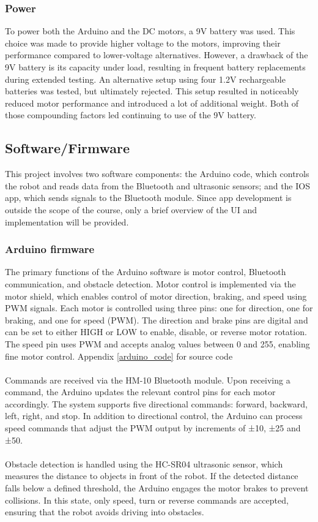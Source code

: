 \subsubsection{Power}
To power both the Arduino and the DC motors, a 9V battery was used. This choice was made to provide higher voltage to the motors, improving their performance compared to lower-voltage alternatives. However, a drawback of the 9V battery is its capacity under load, resulting in frequent battery replacements during extended testing. An alternative setup using four 1.2V rechargeable batteries was tested, but ultimately rejected. This setup resulted in noticeably reduced motor performance and introduced a lot of additional weight. Both of those compounding factors led continuing to use of the 9V battery.
\\
\subsection{Software/Firmware}
This project involves two software components: the Arduino code, which controls the robot and reads data from the Bluetooth and ultrasonic sensors; and the IOS app, which sends signals to the Bluetooth module. Since app development is outside the scope of the course, only a brief overview of the UI and implementation will be provided. \\
\subsubsection{Arduino firmware}
The primary functions of the Arduino software is motor control, Bluetooth communication, and obstacle detection. Motor control is implemented via the motor shield, which enables control of motor direction, braking, and speed using PWM signals. Each motor is controlled using three pins: one for direction, one for braking, and one for speed (PWM). The direction and brake pins are digital and can be set to either HIGH or LOW to enable, disable, or reverse motor rotation. The speed pin uses PWM and accepts analog values between 0 and 255, enabling fine motor control. Appendix \ref{arduino_code} for source code
\\ \\
Commands are received via the HM-10 Bluetooth module. Upon receiving a command, the Arduino updates the relevant control pins for each motor accordingly. The system supports five directional commands: forward, backward, left, right, and stop. In addition to directional control, the Arduino can process speed commands that adjust the PWM output by increments of ±10, ±25 and ±50.
\\ \\
Obstacle detection is handled using the HC-SR04 ultrasonic sensor, which measures the distance to objects in front of the robot. If the detected distance falls below a defined threshold, the Arduino engages the motor brakes to prevent collisions. In this state, only speed, turn or reverse commands are accepted, ensuring that the robot avoids driving into obstacles.
\\
